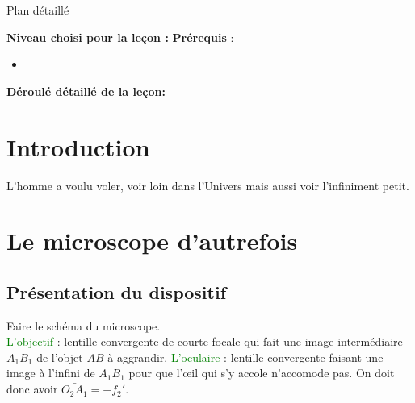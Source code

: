 \begin{reportBlock}{Plan détaillé}

  \textbf{Niveau choisi pour la leçon :} 
  \newline
  \textbf{Prérequis} : \begin{itemize}
      \item 
  \end{itemize}

  \textbf{Déroulé détaillé de la leçon: }  
  
  \section*{Introduction}
  L'homme a voulu voler, voir loin dans l'Univers mais aussi voir l'infiniment petit.

  \section{Le microscope \og d'autrefois \fg }

  \subsection{Présentation du dispositif}
  Faire le schéma du microscope.\\
  \textcolor{green}{L'objectif} : lentille convergente de courte focale qui fait une image intermédiaire $A_1B_1$ de l'objet $AB$ à aggrandir. \textcolor{green}{L'oculaire} : lentille convergente faisant une image à l'infini de $A_1B_1$ pour que l'\oe il qui s'y accole n'accomode pas. On doit donc avoir $\bar{O_2A_1}=-f_2'$.


\end{reportBlock}
